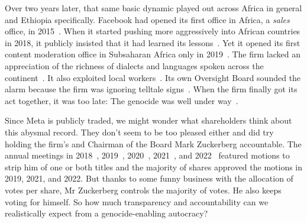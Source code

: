 Over two years later, that same basic dynamic played out across Africa in
general and Ethiopia specifically. Facebook had opened its first office in
Africa, a \emph{sales} office, in 2015~\cite{Wagner2015}. When it started
pushing more aggressively into African countries in 2018, it publicly insisted
that it had learned its lessons~\cite{Tiku2018}. Yet it opened its first content
moderation office in Subsaharan Africa only in 2019~\cite{Agutu2019}. The firm
lacked an appreciation of the richness of dialects and languages spoken across
the continent~\cite{FickDave2019,JacksonTownsendea2022,Madung2021}. It also
exploited local workers~\cite{AlSibai2022,Perrigo2022,Perrigo2023}. Its own
Oversight Board sounded the alarm because the firm was ignoring telltale
signs~\cite{Faife2021}. When the firm finally got its act together, it was too
late: The genocide was well under
way~\cite{Allen2022,Gilbert2020,GlobalWitness2022,Ilori2020,Malik2022,ElliottChristopherea2021,ZelalemGuest2021,RobinsEarly2021}.

Since Meta is publicly traded, we might wonder what shareholders think about
this abysmal record. They don't seem to be too pleased either and did try
holding the firm's  and Chairman of the Board Mark Zuckerberg
accountable. The annual meetings in 2018~\cite{Butler2018},
2019~\cite{Sumagaysay2019}, 2020~\cite{McRitchie2020}, 2021~\cite{Nix2021}, and
2022~\cite{WatersAgnew2022} featured motions to strip him of one or both titles
and the majority of shares approved the motions in 2019, 2021, and 2022. But
thanks to some funny business with the allocation of votes per share, Mr
Zuckerberg controls the majority of votes. He also keeps voting for himself. So
how much transparency and accountability can we realistically expect from a
genocide-enabling autocracy?
